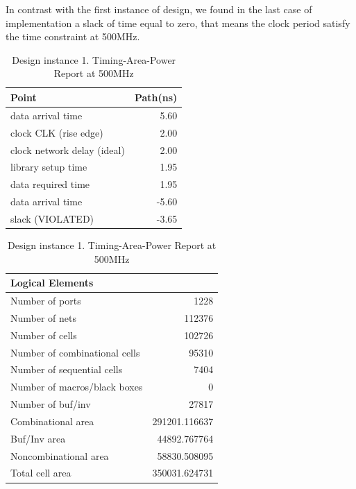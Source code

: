 \documentclass[journal,comsoc]{IEEEtran}
\begin{document}
In contrast with the first instance of design, we found in the last case of implementation a slack of time equal to zero, that means the clock period satisfy the time constraint at 500MHz.

\begin{table}[t!]
	\centering%
	\caption{Design instance 1. Timing-Area-Power Report at 500MHz}
	\label{tab:reporte2} 	
	\begin{tabular}{@{}lr@{}}
		Point 						& Path(ns)\\
		\hline\hline
		data arrival time   		& 5.60\\ 
		clock CLK (rise edge)  		& 2.00\\
		clock network delay (ideal) & 2.00\\
		library setup time			& 1.95\\
		\hline
		data required time			& 1.95\\
		data arrival time           & -5.60\\
		\hline
		slack (VIOLATED)            & -3.65\\	
		\hline
	\end{tabular}

	\begin{tabular}{@{}lr@{}}\\
		Logical Elements\\
		\hline\hline
		Number of ports               &1228\\
		Number of nets                &112376\\
		Number of cells               &102726\\
		Number of combinational cells &95310\\
		Number of sequential cells    &7404\\
		Number of macros/black boxes  &0\\
		Number of buf/inv             &27817\\
		\hline
		Combinational area            &291201.116637\\
		Buf/Inv area                  &44892.767764\\
		Noncombinational area         &58830.508095\\
		\hline
		Total cell area               &350031.624731\\	
		\hline
	\end{tabular}


\end{table}
\end{document}
